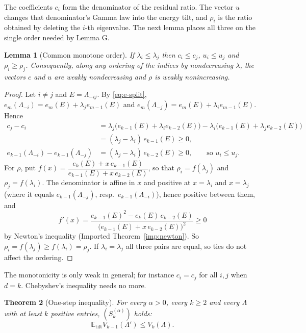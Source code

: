 \documentclass[11pt,a4paper]{article}
\newtheorem{theorem}{Theorem}[section]
\newtheorem{lemma}[theorem]{Lemma}
\theoremstyle{definition}
\newcommand{\E}{\mathbb{E}}
\newcommand{\tilt}{\mathrm{tilt}}
\begin{document}
The coefficients $c_i$ form the denominator of the residual ratio. The vector $u$ changes that denominator's Gamma law into the energy tilt, and $\rho_i$ is the ratio obtained by deleting the $i$-th eigenvalue. The next lemma places all three on the single order needed by Lemma G.

\begin{lemma}[Common monotone order]\label{lem:mono}
If $\lambda_i\le\lambda_j$ then $c_i\le c_j$, $u_i\le u_j$ and $\rho_i\ge\rho_j$. Consequently, along any ordering of the indices by nondecreasing $\lambda$, the vectors $c$ and $u$ are weakly nondecreasing and $\rho$ is weakly nonincreasing.
\end{lemma}

\begin{proof}
Let $i\ne j$ and $E=\Lambda_{-ij}$. By \eqref{eq:e-split}, $e_{m}(\Lambda_{-i})=e_m(E)+\lambda_je_{m-1}(E)$ and $e_m(\Lambda_{-j})=e_m(E)+\lambda_ie_{m-1}(E)$. Hence
\begin{align*}
c_j-c_i&=\lambda_j\big(e_{k-1}(E)+\lambda_ie_{k-2}(E)\big)-\lambda_i\big(e_{k-1}(E)+\lambda_je_{k-2}(E)\big)\\
&=(\lambda_j-\lambda_i)\,e_{k-1}(E)\ge0,\\
e_{k-1}(\Lambda_{-i})-e_{k-1}(\Lambda_{-j})&=(\lambda_j-\lambda_i)\,e_{k-2}(E)\ge0,\qquad\text{so } u_i\le u_j.
\end{align*}
For $\rho$, put $f(x)=\dfrac{e_k(E)+x\,e_{k-1}(E)}{e_{k-1}(E)+x\,e_{k-2}(E)}$, so that $\rho_i=f(\lambda_j)$ and $\rho_j=f(\lambda_i)$. The denominator is affine in $x$ and positive at $x=\lambda_i$ and $x=\lambda_j$ (where it equals $e_{k-1}(\Lambda_{-j})$, resp.\ $e_{k-1}(\Lambda_{-i})$), hence positive between them, and
\[
f'(x)=\frac{e_{k-1}(E)^2-e_k(E)\,e_{k-2}(E)}{\big(e_{k-1}(E)+x\,e_{k-2}(E)\big)^2}\ge0
\]
by Newton's inequality (Imported Theorem~\ref{imp:newton}). So $\rho_i=f(\lambda_j)\ge f(\lambda_i)=\rho_j$. If $\lambda_i=\lambda_j$ all three pairs are equal, so ties do not affect the ordering.
\end{proof}

The monotonicity is only weak in general; for instance $c_i=c_j$ for all $i,j$ when $d=k$. Chebyshev's inequality needs no more.

\begin{theorem}[One-step inequality]\label{thm:Sk}
For every $\alpha>0$, every $k\ge2$ and every $\Lambda$ with at least $k$ positive entries, $(S^{(\alpha)}_k)$ holds:
\[
\E_\tilt V_{k-1}(\Lambda')\le V_k(\Lambda).
\]
\end{theorem}
\end{document}

